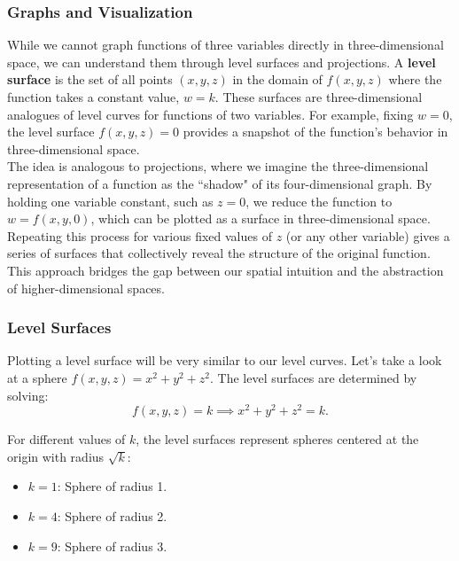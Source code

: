 \subsubsection*{Graphs and Visualization}

\noindent While we cannot graph functions of three variables directly in three-dimensional space, we can understand them through level surfaces and projections. A \textbf{level surface} is the set of all points \((x, y, z)\) in the domain of \(f(x, y, z)\) where the function takes a constant value, \( w = k \). These surfaces are three-dimensional analogues of level curves for functions of two variables. For example, fixing \( w = 0 \), the level surface \( f(x, y, z) = 0 \) provides a snapshot of the function's behavior in three-dimensional space. \\

\noindent The idea is analogous to projections, where we imagine the three-dimensional representation of a function as the ``shadow" of its four-dimensional graph. By holding one variable constant, such as \( z = 0 \), we reduce the function to \( w = f(x, y, 0) \), which can be plotted as a surface in three-dimensional space. Repeating this process for various fixed values of \( z \) (or any other variable) gives a series of surfaces that collectively reveal the structure of the original function. This approach bridges the gap between our spatial intuition and the abstraction of higher-dimensional spaces.

\subsubsection*{Level Surfaces} 

\noindent Plotting a level surface will be very similar to our level curves. Let's take a look at a sphere \(f(x, y, z) = x^2 + y^2 + z^2\). The level surfaces are determined by solving:
\[
f(x, y, z) = k \implies x^2 + y^2 + z^2 = k.
\]

\noindent For different values of \( k \), the level surfaces represent spheres centered at the origin with radius \(\sqrt{k}\):
\begin{itemize}
    \item \( k = 1 \): Sphere of radius 1.
    \item \( k = 4 \): Sphere of radius 2.
    \item \( k = 9 \): Sphere of radius 3.
\end{itemize}

